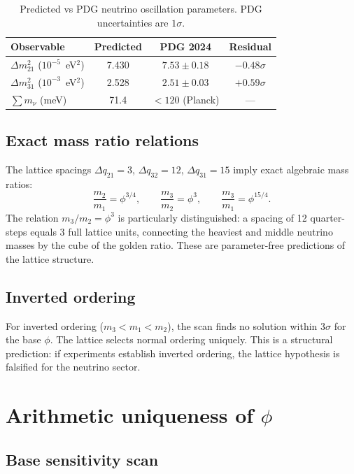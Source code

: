\documentclass[12pt]{article}
\theoremstyle{definition}
\begin{document}
\begin{table}[htbp]
\centering
\caption{Predicted vs PDG neutrino oscillation parameters.
PDG uncertainties are $1\sigma$.}
\label{tab:comparison}
\begin{tabular}{lccc}
\toprule
Observable & Predicted & PDG 2024 & Residual \\
\midrule
$\Delta m^2_{21}$ ($10^{-5}$~eV$^2$) & 7.430 &
  $7.53 \pm 0.18$ & $-0.48\sigma$ \\
$\Delta m^2_{31}$ ($10^{-3}$~eV$^2$) & 2.528 &
  $2.51 \pm 0.03$ & $+0.59\sigma$ \\
$\sum m_\nu$ (meV) & 71.4 & $< 120$ (Planck) & --- \\
\bottomrule
\end{tabular}
\end{table}

\subsection{Exact mass ratio relations}

The lattice spacings $\Delta q_{21} = 3$, $\Delta q_{32} = 12$,
$\Delta q_{31} = 15$ imply exact algebraic mass ratios:
\begin{equation}
  \frac{m_2}{m_1} = \phi^{3/4}, \qquad
  \frac{m_3}{m_2} = \phi^{3}, \qquad
  \frac{m_3}{m_1} = \phi^{15/4}.
  \label{eq:ratios}
\end{equation}
The relation $m_3/m_2 = \phi^3$ is particularly distinguished:
a spacing of 12 quarter-steps equals 3 full lattice units, connecting
the heaviest and middle neutrino masses by the cube of the golden ratio.
These are parameter-free predictions of the lattice structure.

\subsection{Inverted ordering}

For inverted ordering ($m_3 < m_1 < m_2$), the scan finds no solution
within $3\sigma$ for the base $\phi$. The lattice selects normal
ordering uniquely. This is a structural prediction: if experiments
establish inverted ordering, the lattice hypothesis is falsified
for the neutrino sector.

\section{Arithmetic uniqueness of $\phi$}
\label{sec:uniqueness}

\subsection{Base sensitivity scan}
\end{document}
